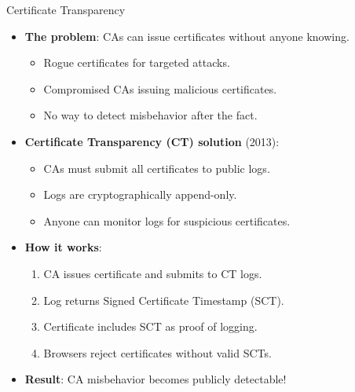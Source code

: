 \documentclass[aspectratio=169, lualatex, handout]{beamer}
\begin{document}
\begin{frame}{Certificate Transparency}
	\begin{itemize}
		\item \textbf{The problem}: CAs can issue certificates without anyone knowing.
		      \begin{itemize}
			      \item Rogue certificates for targeted attacks.
			      \item Compromised CAs issuing malicious certificates.
			      \item No way to detect misbehavior after the fact.
		      \end{itemize}
		\item \textbf{Certificate Transparency (CT) solution} (2013):
		      \begin{itemize}
			      \item CAs must submit all certificates to public logs.
			      \item Logs are cryptographically append-only.
			      \item Anyone can monitor logs for suspicious certificates.
		      \end{itemize}
		\item \textbf{How it works}:
		      \begin{enumerate}
			      \item CA issues certificate and submits to CT logs.
			      \item Log returns Signed Certificate Timestamp (SCT).
			      \item Certificate includes SCT as proof of logging.
			      \item Browsers reject certificates without valid SCTs.
		      \end{enumerate}
		\item \textbf{Result}: CA misbehavior becomes publicly detectable!
	\end{itemize}
\end{frame}
\end{document}
